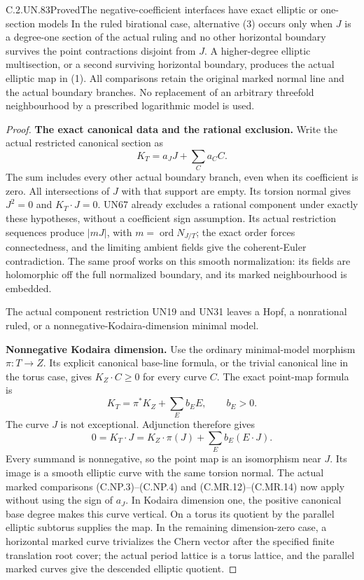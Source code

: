\begin{statement}{C.2.UN.83}{Proved}{The negative-coefficient interfaces have exact elliptic or one-section models}
In the ruled birational case, alternative (3) occurs
only when \(J\) is a degree-one section of the actual
ruling and no other horizontal boundary survives the
point contractions disjoint from \(J\). A higher-degree
elliptic multisection, or a second surviving horizontal
boundary, produces the actual elliptic map in (1).
All comparisons retain the original marked normal line
and the actual boundary branches. No replacement of an
arbitrary threefold neighbourhood by a prescribed
logarithmic model is used.
\end{statement}

\begin{proof}
\par\medskip\noindent\textbf{The exact canonical data and the rational exclusion.}
Write the actual restricted canonical section as
\[
              K_T=a_JJ+\sum_C a_CC.
 \tag{C.TI.5}
\]
The sum includes every other actual boundary branch,
even when its coefficient is zero. All intersections
of \(J\) with that support are empty. Its torsion
normal gives \(J^2=0\) and \(K_T\cdot J=0\).
UN67 already excludes a rational component under
exactly these hypotheses, without a coefficient
sign assumption. Its actual restriction sequences
produce \(|mJ|\), with
\(m=\operatorname{ord}N_{J/T}\); the exact order
forces connectedness, and the limiting ambient
fields give the coherent-Euler contradiction.
The same proof works on this smooth normalization:
its fields are holomorphic off the full normalized
boundary, and its marked neighbourhood is embedded.

The actual component restriction UN19 and UN31
leaves a Hopf, a nonrational ruled, or a
nonnegative-Kodaira-dimension minimal model.

\par\medskip\noindent\textbf{Nonnegative Kodaira dimension.}
Use the ordinary minimal-model morphism
\(\pi:T\to Z\). Its explicit canonical base-line
formula, or the trivial canonical line in the
torus case, gives \(K_Z\cdot C\ge0\) for every
curve \(C\). The exact point-map formula is
\[
 K_T=\pi^*K_Z+\sum_E b_EE,\qquad b_E>0.
 \tag{C.TI.6}
\]
The curve \(J\) is not exceptional. Adjunction
therefore gives
\[
 0=K_T\cdot J
   =K_Z\cdot\pi(J)+\sum_E b_E(E\cdot J).
 \tag{C.TI.7}
\]
Every summand is nonnegative, so the point map is
an isomorphism near \(J\). Its image is a smooth
elliptic curve with the same torsion normal.
The actual marked comparisons (C.NP.3)--(C.NP.4)
and (C.MR.12)--(C.MR.14) now apply without using
the sign of \(a_J\). In Kodaira dimension one,
the positive canonical base degree makes this
curve vertical. On a torus its quotient by the
parallel elliptic subtorus supplies the map.
In the remaining dimension-zero case, a
horizontal marked curve trivializes the Chern
vector after the specified finite translation
root cover; the actual period lattice is a
torus lattice, and the parallel marked curves
give the descended elliptic quotient.


\end{proof}
